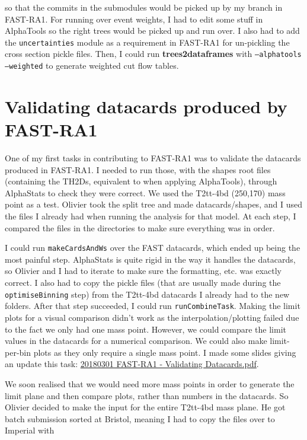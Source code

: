 so that the commits in the submodules would be picked up by my branch in FAST-RA1. For running over event weights, I had to edit some stuff in AlphaTools so the right trees would be picked up and run over. I also had to add the \texttt{uncertainties} module as a requirement in FAST-RA1 for un-pickling the cross section pickle files. Then, I could run \textbf{trees2dataframes} with \texttt{--alphatools --weighted} to generate weighted cut flow tables.


\section{Validating datacards produced by FAST-RA1}

One of my first tasks in contributing to FAST-RA1 was to validate the datacards produced in FAST-RA1. I needed to run those, with the shapes root files (containing the TH2Ds, equivalent to when applying AlphaTools), through AlphaStats to check they were correct. We used the T2tt-4bd (250,170) mass point as a test. Olivier took the split tree and made datacards/shapes, and I used the files I already had when running the analysis for that model. At each step, I compared the files in the directories to make sure everything was in order.

I could run \texttt{makeCardsAndWs} over the FAST datacards, which ended up being the most painful step. AlphaStats is quite rigid in the way it handles the datacards, so Olivier and I had to iterate to make sure the formatting, etc. was exactly correct. I also had to copy the pickle files (that are usually made during the \texttt{optimiseBinning} step) from the T2tt-4bd datacards I already had to the new folders. After that step succeeded, I could run \texttt{runCombineTask}. Making the limit plots for a visual comparison didn't work as the interpolation/plotting failed due to the fact we only had one mass point. However, we could compare the limit values in the datacards for a numerical comparison. We could also make limit-per-bin plots as they only require a single mass point. I made some slides giving an update this task: \href{run:./sec36/20180301 FAST-RA1 - Validating Datacards.pdf}{20180301 FAST-RA1 - Validating Datacards.pdf}.

We soon realised that we would need more mass points in order to generate the limit plane and then compare plots, rather than numbers in the datacards. So Olivier decided to make the input for the entire T2tt-4bd mass plane. He got batch submission sorted at Bristol, meaning I had to copy the files over to Imperial with

